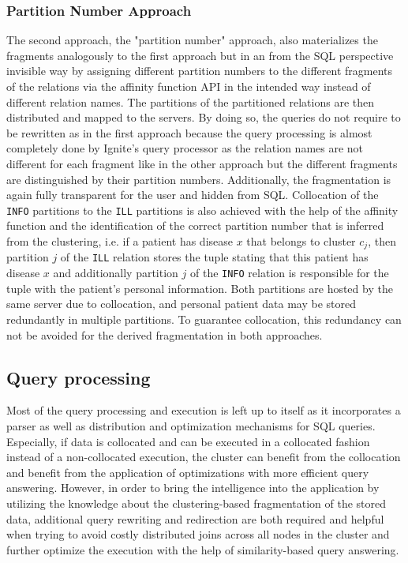 \subsubsection{Partition Number Approach}
\label{sec:impl_alter_partnum}

The second approach, the "partition number" approach, also materializes the fragments analogously to the first approach but in an from the SQL perspective
invisible way by assigning different partition numbers to the different fragments of the relations via the affinity function API in the intended way instead of
different relation names. The partitions of the partitioned relations are then distributed and mapped to the servers. By doing so, the queries do not require to
be rewritten as in the first approach because the query processing is almost completely done by Ignite's query processor as the relation names are not different
for each fragment like in the other approach but the different fragments are distinguished by their partition numbers. Additionally, the fragmentation is again
fully transparent for the user and hidden from SQL. Collocation of the \verb!INFO! partitions to the \verb!ILL! partitions is also achieved with the help of the
affinity function and the identification of the correct partition number that is inferred from the clustering, i.e. if a patient has disease $x$ that belongs to
cluster $c_j$, then partition $j$ of the \verb!ILL! relation stores the tuple stating that this patient has disease $x$ and additionally partition $j$ of the
\verb!INFO! relation is responsible for the tuple with the patient's personal information. Both partitions are hosted by the same server due to collocation, 
and personal patient data may be stored redundantly in multiple partitions. To guarantee collocation, this redundancy can not be avoided for the derived
fragmentation in both approaches.



\subsection{Query processing}
\label{sec:impl_qpro}

Most of the query processing and execution is left up to  itself as it incorporates a parser as well as distribution and optimization
mechanisms for SQL queries. Especially, if data is collocated and can be executed in a collocated fashion instead of a non-collocated execution, the cluster 
can benefit from the collocation and benefit from the application of optimizations with more efficient query answering. However, in order to bring the
intelligence into the application by utilizing the knowledge about the clustering-based fragmentation of the stored data, additional query rewriting and
redirection are both required and helpful when trying to avoid costly distributed joins across all nodes in the cluster and further optimize the execution 
with the help of similarity-based query answering.

